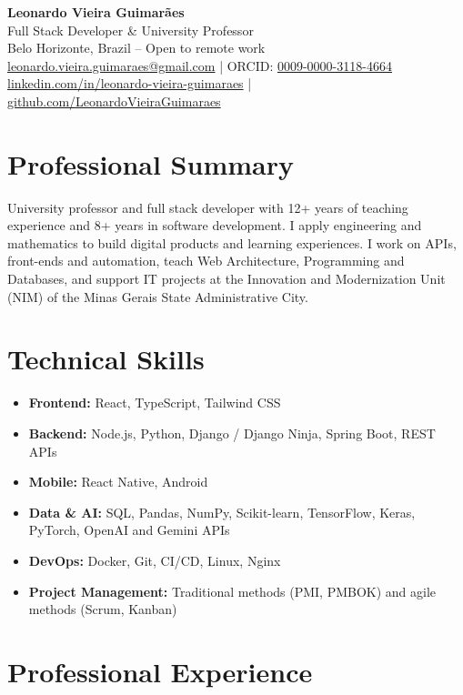 \documentclass[a4paper,10pt]{article}
\begin{document}
\begin{center}
    {\LARGE \textbf{Leonardo Vieira Guimarães}} \\[2pt]
    Full Stack Developer \& University Professor \\
    Belo Horizonte, Brazil -- Open to remote work \\
    \href{mailto:leonardo.vieira.guimaraes@gmail.com}{leonardo.vieira.guimaraes@gmail.com} \;|\;
    ORCID: \href{https://orcid.org/0009-0000-3118-4664}{0009-0000-3118-4664} \\
    \href{https://www.linkedin.com/in/leonardo-vieira-guimaraes/}{linkedin.com/in/leonardo-vieira-guimaraes} \;|\;
    \href{https://github.com/LeonardoVieiraGuimaraes}{github.com/LeonardoVieiraGuimaraes}
\end{center}

\section*{Professional Summary}
University professor and full stack developer with 12+ years of teaching experience and 8+ years in software development. I apply engineering and mathematics to build digital products and learning experiences. I work on APIs, front-ends and automation, teach Web Architecture, Programming and Databases, and support IT projects at the Innovation and Modernization Unit (NIM) of the Minas Gerais State Administrative City.

\section*{Technical Skills}
\begin{itemize}
    \item \textbf{Frontend:} React, TypeScript, Tailwind CSS
    \item \textbf{Backend:} Node.js, Python, Django / Django Ninja, Spring Boot, REST APIs
    \item \textbf{Mobile:} React Native, Android
    \item \textbf{Data \& AI:} SQL, Pandas, NumPy, Scikit-learn, TensorFlow, Keras, PyTorch, OpenAI and Gemini APIs
    \item \textbf{DevOps:} Docker, Git, CI/CD, Linux, Nginx
    \item \textbf{Project Management:} Traditional methods (PMI, PMBOK) and agile methods (Scrum, Kanban)
\end{itemize}

\section*{Professional Experience}
\end{document}
